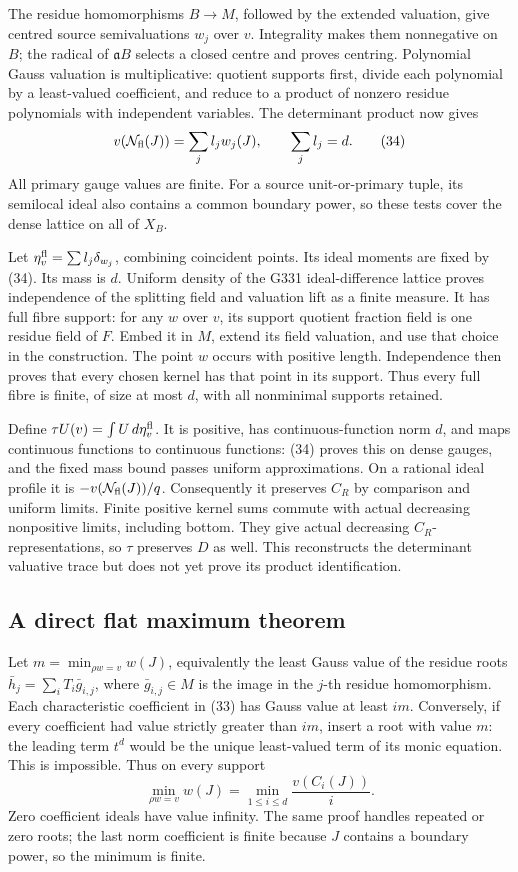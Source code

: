 The residue homomorphisms \(B\to M\), followed by the extended
valuation, give centred source semivaluations \(w_j\) over \(v\).
Integrality makes them nonnegative on \(B\); the radical of
\(\mathfrak a B\) selects a closed centre and proves centring.
Polynomial Gauss valuation is multiplicative: quotient
supports first, divide each polynomial by a least-valued
coefficient, and reduce to a product of nonzero residue
polynomials with independent variables. The determinant
product now gives
\[
 v(\mathcal N_{\rm fl}(J))=\sum_j l_jw_j(J),\qquad
                      \sum_j l_j=d.                          \tag{34}
\]
All primary gauge values are finite. For a source unit-or-primary
tuple, its semilocal ideal also contains a common boundary
power, so these tests cover the dense lattice on all of \(X_B\).

Let \(\eta_v^{\rm fl}=\sum l_j\delta_{w_j}\), combining
coincident points. Its ideal moments are fixed by (34).
Its mass is \(d\). Uniform density of the G331 ideal-difference
lattice proves independence of the splitting field and
valuation lift as a finite measure.
It has full fibre support: for any \(w\) over \(v\), its
support quotient fraction field is one residue field of
\(F\). Embed it in \(M\), extend its field valuation, and
use that choice in the construction. The point \(w\) occurs
with positive length. Independence then proves that every
chosen kernel has that point in its support. Thus every
full fibre is finite, of size at most \(d\), with all
nonminimal supports retained.

Define \(\tau U(v)=\int U\,d\eta_v^{\rm fl}\).
It is positive, has continuous-function norm \(d\), and
maps continuous functions to continuous functions: (34)
proves this on dense gauges, and the fixed mass bound
passes uniform approximations.
On a rational ideal profile it is
\(-v(\mathcal N_{\rm fl}(J))/q\).
Consequently it preserves \(C_R\) by comparison and uniform
limits. Finite positive kernel sums commute with actual
decreasing nonpositive limits, including bottom. They give
actual decreasing \(C_R\)-representations, so \(\tau\)
preserves \(D\) as well.
This reconstructs the determinant valuative trace but does
not yet prove its product identification.

\subsection*{A direct flat maximum theorem}
Let \(m=\min_{\rho w=v}w(J)\), equivalently the least Gauss
value of the residue roots \(\bar h_j=\sum_i T_i\bar g_{i,j}\),
where \(\bar g_{i,j}\in M\) is the image in the \(j\)-th
residue homomorphism.
Each characteristic coefficient in (33) has Gauss value
at least \(im\). Conversely, if every coefficient had
value strictly greater than \(im\), insert a root with
value \(m\): the leading term \(t^d\) would be the unique
least-valued term of its monic equation. This is impossible.
Thus on every support
\[
 \min_{\rho w=v}w(J)=\min_{1\leq i\leq d}\frac{v(C_i(J))}{i}.
                                                               \tag{35}
\]
Zero coefficient ideals have value infinity.
The same proof handles repeated or zero roots; the last
norm coefficient is finite because \(J\) contains a boundary
power, so the minimum is finite.

